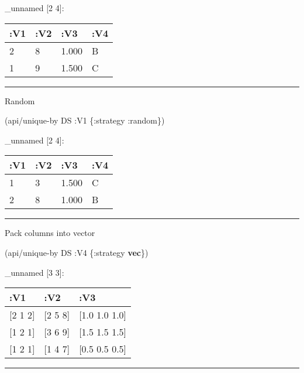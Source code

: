 \documentclass[]{article}
\newenvironment{Shaded}{\begin{snugshade}}{\end{snugshade}}
\newcommand{\KeywordTok}[1]{\textcolor[rgb]{0.13,0.29,0.53}{\textbf{#1}}}
\newcommand{\AttributeTok}[1]{\textcolor[rgb]{0.77,0.63,0.00}{#1}}
\newcommand{\NormalTok}[1]{#1}
\begin{document}
\_unnamed {[}2 4{]}:

\begin{longtable}[]{@{}llll@{}}
\toprule
:V1 & :V2 & :V3 & :V4\tabularnewline
\midrule
\endhead
2 & 8 & 1.000 & B\tabularnewline
1 & 9 & 1.500 & C\tabularnewline
\bottomrule
\end{longtable}

\begin{center}\rule{0.5\linewidth}{0.5pt}\end{center}

Random

\begin{Shaded}
\begin{Highlighting}[]
\NormalTok{(api/unique-by DS }\AttributeTok{:V1}\NormalTok{ \{}\AttributeTok{:strategy} \AttributeTok{:random}\NormalTok{\})}
\end{Highlighting}
\end{Shaded}

\_unnamed {[}2 4{]}:

\begin{longtable}[]{@{}llll@{}}
\toprule
:V1 & :V2 & :V3 & :V4\tabularnewline
\midrule
\endhead
1 & 3 & 1.500 & C\tabularnewline
2 & 8 & 1.000 & B\tabularnewline
\bottomrule
\end{longtable}

\begin{center}\rule{0.5\linewidth}{0.5pt}\end{center}

Pack columns into vector

\begin{Shaded}
\begin{Highlighting}[]
\NormalTok{(api/unique-by DS }\AttributeTok{:V4}\NormalTok{ \{}\AttributeTok{:strategy} \KeywordTok{vec}\NormalTok{\})}
\end{Highlighting}
\end{Shaded}

\_unnamed {[}3 3{]}:

\begin{longtable}[]{@{}lll@{}}
\toprule
:V1 & :V2 & :V3\tabularnewline
\midrule
\endhead
{[}2 1 2{]} & {[}2 5 8{]} & {[}1.0 1.0 1.0{]}\tabularnewline
{[}1 2 1{]} & {[}3 6 9{]} & {[}1.5 1.5 1.5{]}\tabularnewline
{[}1 2 1{]} & {[}1 4 7{]} & {[}0.5 0.5 0.5{]}\tabularnewline
\bottomrule
\end{longtable}

\begin{center}\rule{0.5\linewidth}{0.5pt}\end{center}
\end{document}
